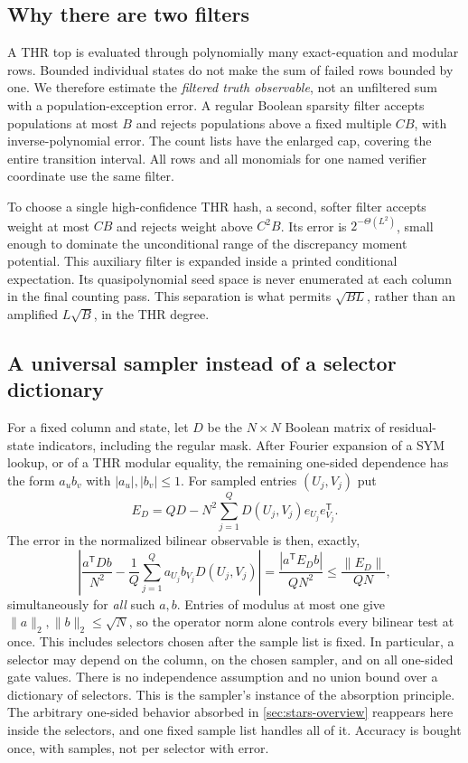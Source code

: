 \documentclass[11pt,letterpaper]{article}
\theoremstyle{definition}
\theoremstyle{remark}
\begin{document}
\subsection{Why there are two filters}
A THR top is evaluated through polynomially many exact-equation and
modular rows. Bounded individual states do not make the sum of failed
rows bounded by one. We therefore estimate the \emph{filtered truth
observable}, not an unfiltered sum with a population-exception error.
A regular Boolean sparsity filter accepts populations at most $B$ and
rejects populations above a fixed multiple $CB$, with inverse-polynomial
error. The count lists have the enlarged cap, covering the entire
transition interval. All rows and all monomials for one named verifier
coordinate use the same filter.

To choose a single high-confidence THR hash, a second, softer filter
accepts weight at most $CB$ and rejects weight above $C^2B$. Its error
is $2^{-\Theta(L^2)}$, small enough to dominate the unconditional range
of the discrepancy moment potential. This auxiliary filter is expanded
inside a printed conditional expectation. Its quasipolynomial seed
space is never enumerated at each column in the final counting pass.
This separation is what permits $\sqrt{BL}$, rather than an amplified
$L\sqrt B$, in the THR degree.

\subsection{A universal sampler instead of a selector dictionary}
For a fixed column and state, let $D$ be the $N\times N$ Boolean matrix
of residual-state indicators, including the regular mask. After Fourier
expansion of a SYM lookup, or of a THR modular equality, the remaining
one-sided dependence has the form $a_u b_v$ with $|a_u|,|b_v|\le1$.
For sampled entries $(U_j,V_j)$ put
\[
E_D=QD-N^2\sum_{j=1}^Q D(U_j,V_j)e_{U_j}e_{V_j}^{\mathsf T}.
\]
The error in the normalized bilinear observable is then, exactly,
\[
\left|\frac{a^{\mathsf T}Db}{N^2}
-\frac1Q\sum_{j=1}^Q a_{U_j}b_{V_j}D(U_j,V_j)\right|
=\frac{|a^{\mathsf T}E_Db|}{QN^2}
\le\frac{\|E_D\|}{QN},
\]
simultaneously for \emph{all} such $a,b$. Entries of modulus at most
one give $\|a\|_2,\|b\|_2\le\sqrt N$, so the operator norm alone
controls every bilinear test at once. This includes selectors chosen
after the sample list is fixed. In
particular, a selector may depend on the column, on the chosen
sampler, and on all one-sided gate values. There is no independence
assumption and no union bound over a dictionary of selectors. This is
the sampler's instance of the absorption principle. The arbitrary
one-sided behavior absorbed in \cref{sec:stars-overview} reappears
here inside the selectors, and one fixed sample list handles all of
it. Accuracy is bought once, with samples, not per selector with
error.
\end{document}
